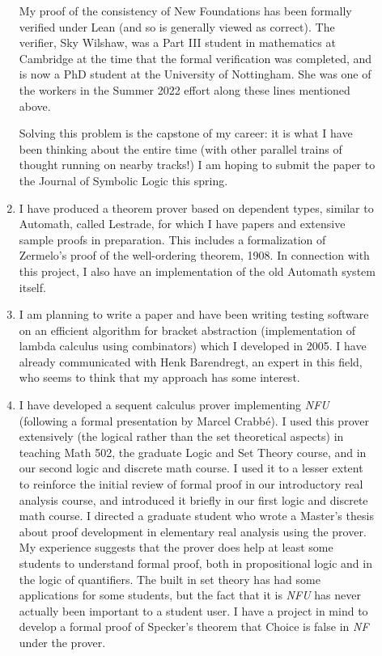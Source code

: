 \begin{description}
\begin{enumerate}
My proof of the consistency of New Foundations has been formally verified under Lean (and so is generally viewed as correct).  The verifier, Sky Wilshaw, was a Part III student in mathematics at Cambridge at the time that the formal verification was completed, and is now a PhD student at the University of Nottingham.   She was one of the workers in the Summer 2022 effort along these lines mentioned above.

Solving this problem is the capstone of my career:  it is what I have been thinking about the entire time (with other parallel trains of thought running on nearby tracks!)   I am hoping to submit the paper to the Journal of Symbolic Logic this spring.

\item  I have produced a theorem prover based on dependent types, similar to Automath, called Lestrade,
for which I have papers and extensive sample proofs in preparation.  This includes a formalization of Zermelo's proof of the well-ordering theorem, 1908.  In connection with this project, I also
have an implementation of the old Automath system itself.

\item I am planning to write a paper and have been writing testing
software on an efficient algorithm for bracket abstraction
(implementation of lambda calculus using combinators) which I
developed in 2005.  I have already communicated with Henk Barendregt,
an expert in this field, who seems to think that my approach has some
interest.

\item I have developed a sequent calculus prover implementing {\em
NFU\/} (following a formal presentation by Marcel Crabb\'e).  I used
this prover extensively (the logical rather than the set theoretical
aspects) in teaching Math 502, the graduate Logic and Set Theory
course, and in our second logic and discrete math course.  I used it
to a lesser extent to reinforce the initial review of formal proof in
our introductory real analysis course, and introduced it briefly in
our first logic and discrete math course.  I directed a graduate
student who wrote a Master's thesis about proof development in
elementary real analysis using the prover.   My
experience suggests that the prover does help at least some students to understand
formal proof, both in propositional logic and in the logic of
quantifiers.  The built in set theory has had some applications for
some students, but the fact that it is {\em NFU\/} has never actually
been important to a student user.  I have a project in mind to develop
a formal proof of Specker's theorem that Choice is false in {\em NF\/}
under the prover.


\end{enumerate}
\end{description}
